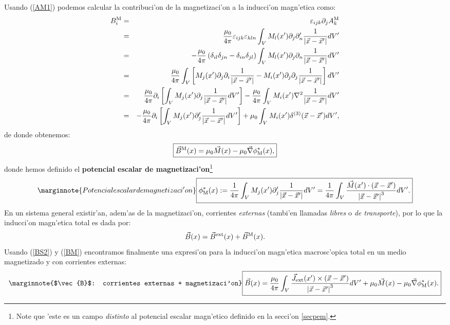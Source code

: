 Usando (\ref{AM1}) podemos calcular la contribuci'on de la magnetizaci'on a  la inducci'on magn'etica como:
\begin{eqnarray}
 B_i^{\rm M}&=&\varepsilon_{ijk}\partial_jA_k^{\rm M} \\
&=&\frac{\mu_0}{4\pi}\varepsilon_{ijk}\varepsilon_{kln}\int_V
M_l(x')\partial_j\partial'_n\frac{1}{\left\vert\vec{x}
-\vec{x}'\right\vert}dV'\\
&=&-\frac{\mu_0}{4\pi}\left(\delta_{il}\delta_{jn}-\delta_{in}
\delta_{jl}\right)\int_VM_l(x')\partial_j\partial_n\frac{1}{\left\vert\vec{x}
-\vec{x}'\right\vert}dV'\\
&=&\frac{\mu_0}{4\pi}\int_V\left[M_j(x')\partial_j\partial_i\frac{1}{
\left\vert\vec { x }-\vec{x}'\right\vert}-M_i(x')\partial_j\partial_j\frac{1}{
\left\vert\vec { x }-\vec{x}'\right\vert}\right]dV'\\
&=&\frac{\mu_0}{4\pi}\partial_i\left[\int_VM_j(x')\partial_j\frac{1}{
\left\vert\vec{x}-\vec{x}'\right\vert}dV'\right]-\frac{\mu_0}{4\pi}\int_V
M_i(x')\nabla^2\frac{1} {\left\vert\vec {x}-\vec{x}'\right\vert}dV'\\
&=&-\frac{\mu_0}{4\pi}\partial_i\left[\int_VM_j(x')\partial'_j\frac{1}{
\left\vert\vec{x}-\vec{x}'\right\vert}dV'\right]+\mu_0\int_V
M_i(x')\delta^{(3)}(\vec{x}-\vec{x}')dV',
\end{eqnarray}
de donde obtenemos:
\begin{equation}
 \boxed{\vec{B}^{\rm M}(x)=\mu_0\vec{M}(x)-\mu_0\vec\nabla\phi^*_{\rm M}(x),}
\label{BM}
\end{equation}
donde hemos definido el \textbf{potencial escalar de magnetizaci'on}\footnote{Note que 'este es un campo \textit{distinto} al potencial escalar magn'etico definido en la secci'on \ref{secpem}.}
\begin{equation}\marginnote{Potencial escalar de magnetizaci'on}
 \boxed{\phi^*_{\rm M}(x):=\frac{1}{4\pi}\int_VM_j(x')\partial'_j\frac{1}{
\left\vert\vec{x}-\vec{x}'\right\vert}dV'=\frac{1}{4\pi}
\int_V\frac{\vec{M}(x')\cdot (\vec{x}-\vec{x}')}{\left\vert\vec{x}-\vec{x}
'\right\vert^3} dV'. }
\end{equation}
En un sistema general existir'an, adem'as de la magnetizaci'on, corrientes
\textit{externas} (tambi'en llamadas \textit{libres} o \textit{de transporte}),
por lo que la inducci'on magn'etica total es dada por:
\begin{equation}
 \vec{B}(x)=\vec{B}^{\rm ext}(x)+\vec{B}^{\rm M}(x) .
\end{equation}
Usando (\ref{BS2}) y (\ref{BM}) encontramos finalmente una expresi'on para 
la inducci'on magn'etica macrosc'opica total en un medio magnetizado y con
corrientes externas:
\begin{equation}\marginnote{$\vec{B}$: corrientes externas + magnetizaci'on}
\boxed{ \vec{B}(x)=\frac{\mu_0}{4\pi}\int_V\frac{\vec{J}_{\rm ext}
(x')\times\left(\vec{x}-\vec{x}'\right)}{\left\vert\vec{x}-\vec{x}'\right\vert^3
} dV' +\mu_0\vec{M}(x)-\mu_0\vec\nabla\phi^*_{\rm M}(x).}
\label{BMG}
\end{equation}


